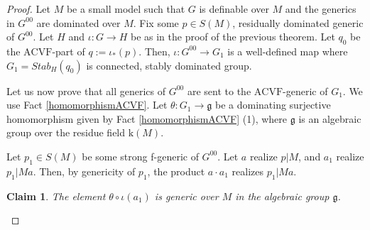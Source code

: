\documentclass[12pt]{article}
\newcommand{\ACVF}{\mathrm{ACVF}}
\newcommand{\0}{\emptyset}
\newcommand{\rf}{\mathrm{k}}
\theoremstyle{plain}%
\newtheorem{claim}{Claim}
\theoremstyle{definition}
\theoremstyle{remark}
\begin{document}
\begin{proof}
\setcounter{claim}{0}
    
   Let $M$ be a small model such that $G$ is definable over $M$ and the generics in $G^{00}$ are dominated over $M$. %
    Fix some $p \in S(M)$, residually dominated generic of $G^{00}$. Let $H$ and $\iota: G\to H$ be as in the proof of the previous theorem. Let $q_0$ be the $\ACVF$-part of $q:=\iota_*(p)$. Then, $\iota: G^{00}\to G_1$ is a well-defined map where $G_1=Stab_H(q_0)$ is connected, stably dominated group. 
    





    Let us now prove that all generics of $G^{00}$ are sent to the $\ACVF$-generic of $G_1$. We use Fact \ref{homomorphismACVF}. Let $\theta: G_1 \rightarrow \mathfrak{g}$ be a dominating surjective homomorphism given by Fact \ref{homomorphismACVF} (1), where $\mathfrak{g}$ is an algebraic group over the residue field $\rf(M)$. 
    
    Let $p_1 \in S(M)$ be some strong f-generic of $G^{00}$. Let $a$ realize $p|M$, and $a_1$ realize $p_1|{M a}$. Then, by genericity of $p_1$, the product $a \cdot a_1$ realizes $p_1|{M a}$. 

    \begin{claim}
        The element $\theta \circ \iota (a_1)$ is generic over $M$ in the algebraic group $\mathfrak{g}$.
    \end{claim}


\end{proof}
\end{document}
